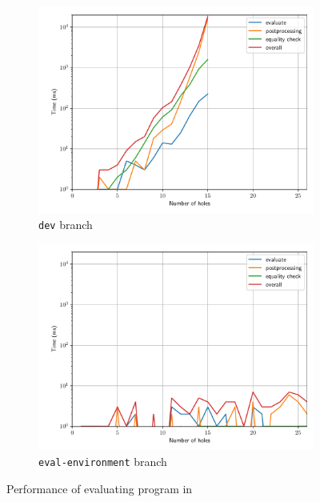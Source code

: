 \begin{figure}
  \centering
  \begin{subfigure}{0.7\textwidth}
    \includegraphics[width=\textwidth]{img/perf_renum_dev.pdf}
    \caption{\texttt{dev} branch}
    \label{fig:perf-renum-dev}
  \end{subfigure}
  \begin{subfigure}{0.7\textwidth}
    \includegraphics[width=\textwidth]{img/perf_renum_eev.pdf}
    \caption{\texttt{eval-environment} branch}
    \label{fig:perf-renum-eev}
  \end{subfigure}
  \caption{Performance of evaluating program in }
  \label{fig:perf-renum}
\end{figure}


